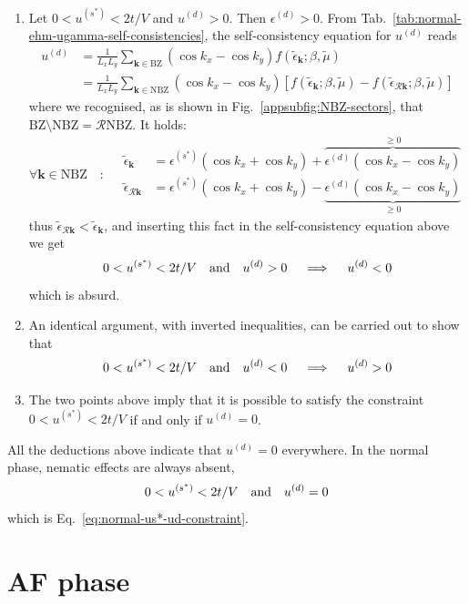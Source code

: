 \begin{enumerate}
	\setcounter{enumi}{\theenumTemp}
	\item Let $0 < u^{(s^*)} < 2t/V$ and $u^{(d)} > 0$. Then $\epsilon^{(d)}>0$. From Tab.~\ref{tab:normal-ehm-ugamma-self-consistencies}, the self-consistency equation for $u^{(d)}$ reads
	\[
	\begin{aligned}
		u^{(d)} &= \frac{1}{L_x L_y} \sum_{\mathbf{k}\in\mathrm{BZ}} (\cos k_x - \cos k_y) f(\tilde{\epsilon}_\mathbf{k};\beta,\tilde{\mu}) \\
		&= \frac{1}{L_x L_y} \sum_{\mathbf{k}\in\mathrm{NBZ}} (\cos k_x - \cos k_y) \left[
		f(\tilde{\epsilon}_\mathbf{k};\beta,\tilde{\mu}) - f(\tilde{\epsilon}_{\mathcal{R}\mathbf{k}};\beta,\tilde{\mu})
		\right]
	\end{aligned}
	\]
	where we recognised, as is shown in Fig.~\ref{appsubfig:NBZ-sectors}, that $\mathrm{BZ} \setminus \mathrm{NBZ} = \mathcal{R} \mathrm{NBZ}$. It holds:
	\[
	\forall \mathbf{k} \in \mathrm{NBZ}
	\quad\colon\quad
	\begin{aligned}
		\tilde{\epsilon}_\mathbf{k} &= \epsilon^{(s^*)} \left( \cos k_x + \cos k_y \right) + \overbrace{\epsilon^{(d)}  \left( \cos k_x - \cos k_y \right) }^{\ge 0} \\
		\tilde{\epsilon}_{\mathcal{R}\mathbf{k}} &= \epsilon^{(s^*)} \left( \cos k_x + \cos k_y \right) - \underbrace{\epsilon^{(d)}  \left( \cos k_x - \cos k_y \right) }_{\ge 0}
	\end{aligned}
	\]
	thus $\tilde{\epsilon}_{\mathcal{R}\mathbf{k}} < \tilde{\epsilon}_\mathbf{k}$, and inserting this fact in the self-consistency equation above we get
	\[
	0 < u^{(s^*)} < 2t/V
	\qq{and}
	u^{(d)} > 0
	\quad\implies\quad
	u^{(d)} < 0
	\]
	which is absurd.
	\item An identical argument, with inverted inequalities, can be carried out to show that
	\[
	0 < u^{(s^*)} < 2t/V
	\qq{and}
	u^{(d)} < 0
	\quad\implies\quad
	u^{(d)} > 0
	\]
	\item The two points above imply that it is possible to satisfy the constraint $0 < u^{(s^*)} < 2t/V$ if and only if $u^{(d)}=0$.
\end{enumerate}
All the deductions above indicate that $u^{(d)}=0$ everywhere. In the normal phase, nematic effects are always absent, 
\[
	0 < u^{(s^*)} < 2t/V
	\qq{and}
	u^{(d)} = 0
\]
which is Eq.~\eqref{eq:normal-us*-ud-constraint}.

\section{AF phase}
\label{appappsec:af-constraints}

